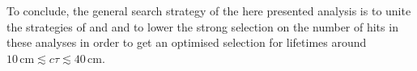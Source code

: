To conclude, the general search strategy of the here presented analysis is to unite the strategies of \cite{bib:CMS:HSCP_8TeV} and \cite{bib:CMS:DT_8TeV} and to lower the strong selection on the number of hits in these analyses in order to get an optimised selection for lifetimes around $10\,\text{cm} \lesssim c\tau \lesssim  40\,\text{cm}$.

